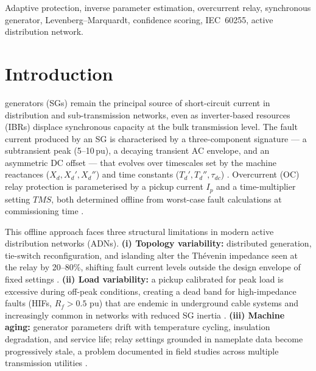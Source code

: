 \documentclass[journal, twoside, 10pt]{IEEEtran}
\newcommand{\pu}{\,\text{pu}}
\begin{document}
\begin{IEEEkeywords}
Adaptive protection, inverse parameter estimation, overcurrent relay,
synchronous generator, Levenberg--Marquardt, confidence scoring,
IEC~60255, active distribution network.
\end{IEEEkeywords}

\section{Introduction}
\label{sec:intro}

 generators (SGs) remain the principal source of
short-circuit current in distribution and sub-transmission networks, even as
inverter-based resources (IBRs) displace synchronous capacity at the bulk
transmission level.  The fault current produced by an SG is characterised by
a three-component signature --- a subtransient peak (5--10\,pu), a decaying
transient AC envelope, and an asymmetric DC offset --- that evolves over
timescales set by the machine reactances ($X_d, X_d', X_d''$) and time
constants ($T_d', T_d'', \tau_{dc}$) \cite{Kundur1994,IEEE1110}.  Overcurrent
(OC) relay protection is parameterised by a pickup current $I_p$ and a
time-multiplier setting $TMS$, both determined offline from worst-case fault
calculations at commissioning time \cite{Blackburn2006,IEC60255-151}.

This offline approach faces three structural limitations in modern active
distribution networks (ADNs).
\textbf{(i) Topology variability:} distributed generation, tie-switch
reconfiguration, and islanding alter the Th\'{e}venin impedance seen at the
relay by 20--80\%, shifting fault current levels outside the design envelope
of fixed settings \cite{Brahma2004,Saleh2017}.
\textbf{(ii) Load variability:} a pickup calibrated for peak load is
excessive during off-peak conditions, creating a dead band for high-impedance
faults (HIFs, $R_f > 0.5\,\pu$) that are endemic in underground cable systems
and increasingly common in networks with reduced SG inertia \cite{Laaksonen2017}.
\textbf{(iii) Machine aging:} generator parameters drift with temperature
cycling, insulation degradation, and service life; relay settings grounded in
nameplate data become progressively stale, a problem documented in field studies
across multiple transmission utilities \cite{Oudalov2009}.
\end{document}
